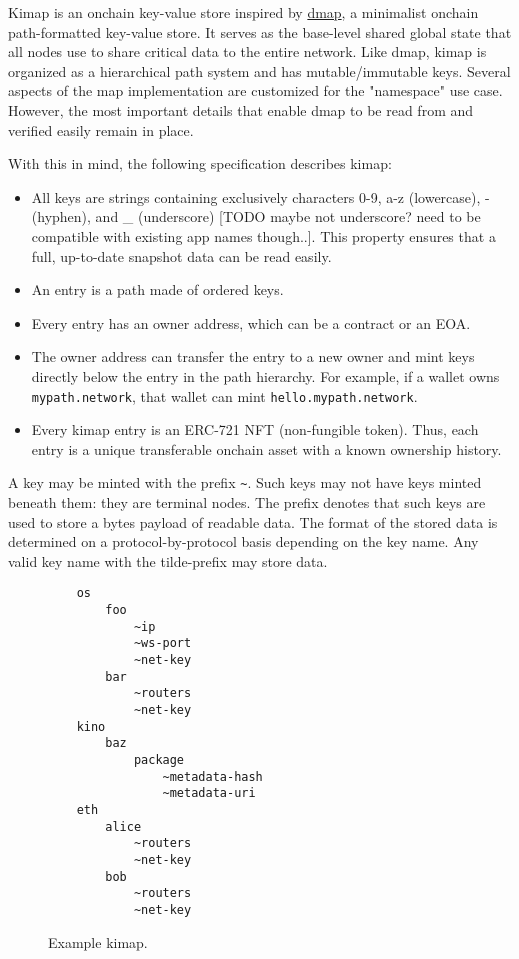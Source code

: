\documentclass[runningheads]{llncs}
\begin{document}
Kimap is an onchain key-value store inspired by \href{https://github.com/dapphub/dmap}{dmap}, a minimalist onchain path-formatted key-value store.
It serves as the base-level shared global state that all nodes use to share critical data to the entire network.
Like dmap, kimap is organized as a hierarchical path system and has mutable/immutable keys.
Several aspects of the map implementation are customized for the "namespace" use case.
However, the most important details that enable dmap to be read from and verified easily remain in place.

With this in mind, the following specification describes kimap:

\begin{itemize}
    \item All keys are strings containing exclusively characters 0-9, a-z (lowercase), - (hyphen), and \_ (underscore) [TODO maybe not underscore? need to be compatible with existing app names though..].
    This property ensures that a full, up-to-date snapshot data can be read easily.
    \item An entry is a path made of ordered keys.
    \item Every entry has an owner address, which can be a contract or an EOA.
    \item The owner address can transfer the entry to a new owner and mint keys directly below the entry in the path hierarchy. For example, if a wallet owns \verb|mypath.network|, that wallet can mint \verb|hello.mypath.network|.
    \item Every kimap entry is an ERC-721 NFT (non-fungible token).
    Thus, each entry is a unique transferable onchain asset with a known ownership history.
\end{itemize}

A key may be minted with the prefix \verb|~|. Such keys may not have keys minted beneath them: they are terminal nodes. The prefix denotes that such keys are used to store a bytes payload of readable data. The format of the stored data is determined on a protocol-by-protocol basis depending on the key name. Any valid key name with the tilde-prefix may store data.

\begin{figure}[H]
    \centering
    \begin{lstlisting}
    os
        foo
            ~ip
            ~ws-port
            ~net-key
        bar
            ~routers
            ~net-key
    kino
        baz
            package
                ~metadata-hash
                ~metadata-uri
    eth
        alice
            ~routers
            ~net-key
        bob
            ~routers
            ~net-key
    \end{lstlisting}
    \caption{Example kimap.}
    \label{fig:example kimap}
\end{figure}
\end{document}
